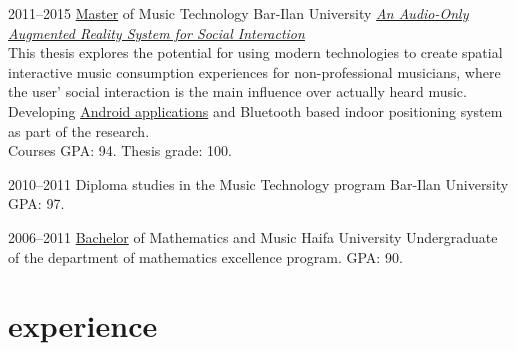 \documentclass[]{friggeri-cv}  %
\begin{document}
\begin{entrylist}

    \entry
    {2011--2015}
    {\href{http://www.tomgurion.me/pdfs/MA.pdf}{Master} {\normalfont of Music Technology}}
    {Bar-Ilan University}
    {\href{http://tomgurion.blogspot.com/p/master-thesis.html}{\emph{An Audio-Only Augmented Reality System for Social Interaction}}\\
    This thesis explores the potential for using modern technologies to create spatial interactive music consumption experiences for non-professional musicians, where the user' social interaction is the main influence over actually heard music.\\
    Developing \href{https://github.com/Nagasaki45/ScenePlayer-Plus/}{Android applications} and Bluetooth based indoor positioning system as part of the research.\\
    Courses GPA: 94. Thesis grade: 100.}

\end{entrylist}
\begin{entrylist}

    \entry
    {2010--2011}
    {Diploma studies {\normalfont in the Music Technology program}}
    {Bar-Ilan University}
    {GPA: 97.}

\end{entrylist}
\begin{entrylist}

    \entry
    {2006--2011}
    {\href{http://db.tt/i2NzAkni}{Bachelor} {\normalfont of Mathematics and Music}}
    {Haifa University}
    {Undergraduate of the department of mathematics excellence program. GPA: 90.}

\end{entrylist}


\section{experience}
\end{document}
